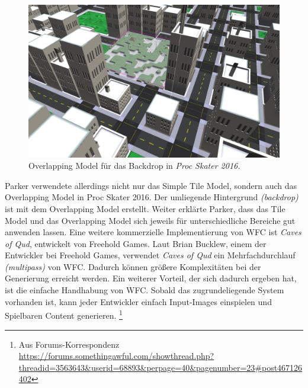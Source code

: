 \documentclass[12pt, a4paper,twoside,openright]{report} %
\begin{document}
\begin{figure}
    \includegraphics[width=1\linewidth]{images/proc-skate-backdrop.png}%
    \caption{Overlapping Model für das Backdrop in \textit{Proc Skater 2016.} \cite{procskater2016}}%
\end{figure}

Parker verwendete allerdings nicht nur das Simple Tile Model, sondern auch das Overlapping Model in Proc Skater 2016.
Der umliegende Hintergrund \textit{(backdrop)} ist mit dem Overlapping Model erstellt.
Weiter erklärte Parker, dass das Tile Model und das Overlapping Model sich jeweils für unterschiedliche Bereiche gut anwenden lassen.
\newline
Eine weitere kommerzielle Implementierung von WFC ist \textit{Caves of Qud}, entwickelt von Freehold Games.
Laut Brian Bucklew, einem der Entwickler bei Freehold Games, verwendet \textit{Caves of Qud} ein Mehrfachdurchlauf \textit{(multipass)} von WFC.
Dadurch können größere Komplexitäten bei der Generierung erreicht werden.
Ein weiterer Vorteil, der sich dadurch ergeben hat, ist die einfache Handhabung von WFC.
Sobald das zugrundeliegende System vorhanden ist, kann jeder Entwickler einfach Input-Images einspielen und Spielbaren Content generieren.
\footnote[6]{Aus Forums-Korrespondenz \url{https://forums.somethingawful.com/showthread.php?threadid=3563643&userid=68893&perpage=40&pagenumber=23\#post467126402}} \cite{Karth2017WaveFunctionCollapseIC}
\end{document}
